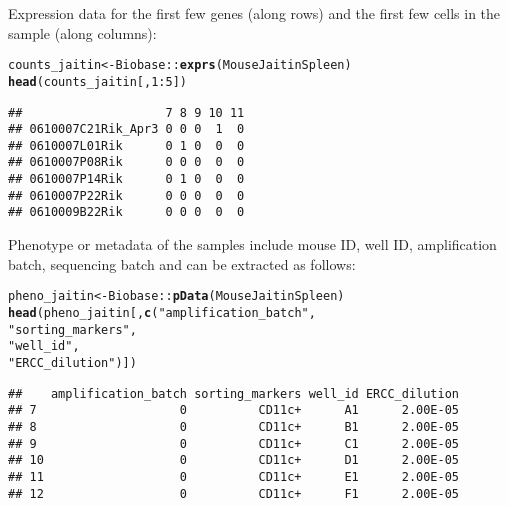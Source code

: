 \documentclass[12pt]{article}\usepackage[]{graphicx}\usepackage[usenames,dvipsnames]{color}
\makeatletter
\newcommand{\hlnum}[1]{\textcolor[rgb]{0.686,0.059,0.569}{#1}}%
\newcommand{\hlstr}[1]{\textcolor[rgb]{0.192,0.494,0.8}{#1}}%
\newcommand{\hlopt}[1]{\textcolor[rgb]{0,0,0}{#1}}%
\newcommand{\hlstd}[1]{\textcolor[rgb]{0.345,0.345,0.345}{#1}}%
\newcommand{\hlkwb}[1]{\textcolor[rgb]{0.69,0.353,0.396}{#1}}%
\newcommand{\hlkwd}[1]{\textcolor[rgb]{0.737,0.353,0.396}{\textbf{#1}}}%
\newenvironment{kframe}{%
 \def\at@end@of@kframe{}%
 \ifinner\ifhmode%
  \def\at@end@of@kframe{\end{minipage}}%
  \begin{minipage}{\columnwidth}%
 \fi\fi%
 \def\FrameCommand##1{\hskip\@totalleftmargin \hskip-\fboxsep
 \colorbox{shadecolor}{##1}\hskip-\fboxsep
     \hskip-\linewidth \hskip-\@totalleftmargin \hskip\columnwidth}%
 \MakeFramed {\advance\hsize-\width
   \@totalleftmargin\z@ \linewidth\hsize
   \@setminipage}}%
 {\par\unskip\endMakeFramed%
 \at@end@of@kframe}
\newenvironment{knitrout}{}{} %
\makeatother
\begin{document}
Expression data for the first few genes (along rows) and the first few
cells in the sample (along columns):

\begin{knitrout}
\color{fgcolor}\begin{kframe}
\begin{alltt}
\hlstd{counts_jaitin} \hlkwb{<-} \hlstd{Biobase}\hlopt{::}\hlkwd{exprs}\hlstd{(MouseJaitinSpleen)}
\hlkwd{head}\hlstd{(counts_jaitin[,}\hlnum{1}\hlopt{:}\hlnum{5}\hlstd{])}
\end{alltt}
\begin{verbatim}
##                    7 8 9 10 11
## 0610007C21Rik_Apr3 0 0 0  1  0
## 0610007L01Rik      0 1 0  0  0
## 0610007P08Rik      0 0 0  0  0
## 0610007P14Rik      0 1 0  0  0
## 0610007P22Rik      0 0 0  0  0
## 0610009B22Rik      0 0 0  0  0
\end{verbatim}
\end{kframe}
\end{knitrout}


Phenotype or metadata of the samples include mouse ID, well ID, amplification batch, sequencing batch and can be extracted as follows:

\begin{knitrout}
\color{fgcolor}\begin{kframe}
\begin{alltt}
\hlstd{pheno_jaitin} \hlkwb{<-} \hlstd{Biobase}\hlopt{::}\hlkwd{pData}\hlstd{(MouseJaitinSpleen)}
\hlkwd{head}\hlstd{(pheno_jaitin[ ,}\hlkwd{c}\hlstd{(}\hlstr{"amplification_batch"}\hlstd{,}
                      \hlstr{"sorting_markers"}\hlstd{,}
                      \hlstr{"well_id"}\hlstd{,}
                      \hlstr{"ERCC_dilution"}\hlstd{)])}
\end{alltt}
\begin{verbatim}
##    amplification_batch sorting_markers well_id ERCC_dilution
## 7                    0          CD11c+      A1      2.00E-05
## 8                    0          CD11c+      B1      2.00E-05
## 9                    0          CD11c+      C1      2.00E-05
## 10                   0          CD11c+      D1      2.00E-05
## 11                   0          CD11c+      E1      2.00E-05
## 12                   0          CD11c+      F1      2.00E-05
\end{verbatim}
\end{kframe}
\end{knitrout}
\end{document}
